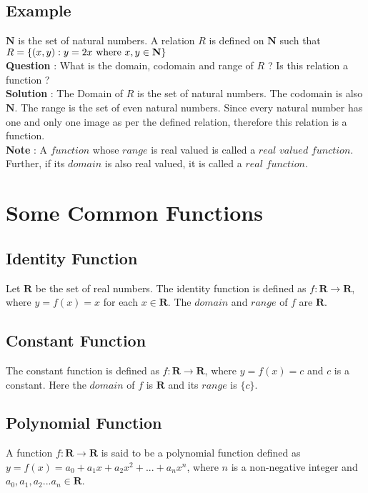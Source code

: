 \documentclass[12pt, letterpaper]{article}
\begin{document}
\subsection{Example}
$\mathbf{N}$ is the set of natural numbers. A relation $R$ is defined on $\mathbf{N}$ such that $R = \{(x,y) : y=2x \textnormal{ where } x,y \in \mathbf{N}\}$\\
\textbf{Question} : What is the domain, codomain and range of $R$ ? Is this relation a function ?\\
\textbf{Solution} : The Domain of $R$ is the set of natural numbers. The codomain is also $\mathbf{N}$. The range is the set of even natural numbers. Since every natural number has one and only one image as per the defined relation, therefore this relation is a function.\\
\textbf{Note} : A $function$ whose $range$ is real valued is called a $real$ $valued$ $function$. Further, if its $domain$ is also real valued, it is called a $real$ $function$.

\section{Some Common Functions}

\subsection{Identity Function}
Let $\mathbf{R}$ be the set of real numbers. The identity function is defined as $f : \mathbf{R} \rightarrow \mathbf{R}$, where $y = f(x) = x$ for each $x \in \mathbf{R}$. The $domain$ and $range$ of $f$ are $\mathbf{R}$.

\subsection{Constant Function}
The constant function is defined as $f : \mathbf{R} \rightarrow \mathbf{R}$, where $y = f(x) = c$ and $c$ is a constant. Here the $domain$ of $f$ is $\mathbf{R}$ and its $range$ is $\{c\}$.

\subsection{Polynomial Function}
A function $f : \mathbf{R} \rightarrow \mathbf{R}$ is said to be a polynomial function defined as $y = f(x) = a_0 + a_1x + a_2x^2 + ... + a_nx^n$, where $n$ is a non-negative integer and $a_0, a_1, a_2...a_n \in \mathbf{R}$.                
\end{document}
